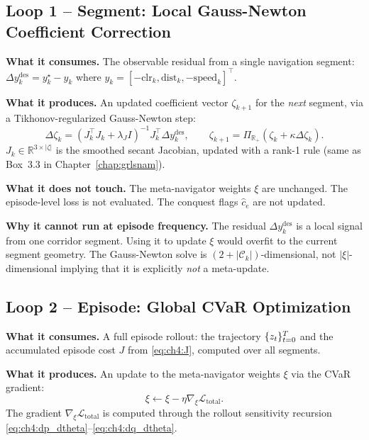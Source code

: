 \subsection{Loop 1 -- Segment: Local Gauss-Newton Coefficient Correction}
\label{subsec:ch4:seg_loop}

\textbf{What it consumes.}
The observable residual from a single navigation segment:
$\Delta y_k^{\mathrm{des}} = y_k^\star - y_k$ where
$y_k = [-\mathrm{clr}_k, \mathrm{dist}_k, -\mathrm{speed}_k]^\top$.

\textbf{What it produces.}
An updated coefficient vector $\zeta_{k+1}$ for the \emph{next}
segment, via a Tikhonov-regularized Gauss-Newton step:
\begin{equation}
  \Delta\zeta_k = (J_k^\top J_k + \lambda_J I)^{-1}J_k^\top\Delta y_k^{\mathrm{des}},
  \qquad
  \zeta_{k+1} = \Pi_{\mathbb{R}_+}(\zeta_k + \kappa\Delta\zeta_k).
  \label{eq:ch4:seg_update}
\end{equation}
$J_k \in \mathbb{R}^{3\times|\zeta|}$ is the smoothed secant Jacobian,
updated with a rank-1 rule (same as Box~3.3 in Chapter~\ref{chap:grlsnam}).

\textbf{What it does not touch.}
The meta-navigator weights $\xi$ are unchanged.
The episode-level loss is not evaluated.
The conquest flags $\hat{c}_e$ are not updated.

\textbf{Why it cannot run at episode frequency.}
The residual $\Delta y_k^{\mathrm{des}}$ is a local signal from one
corridor segment.
Using it to update $\xi$ would overfit to the current segment geometry.
The Gauss-Newton solve is $(2+|\mathcal{C}_k|)$-dimensional,
not $|\xi|$-dimensional implying that it is explicitly \emph{not} a meta-update.

\subsection{Loop 2 -- Episode: Global CVaR Optimization}
\label{subsec:ch4:ep_loop}

\textbf{What it consumes.}
A full episode rollout: the trajectory $\{z_t\}_{t=0}^T$
and the accumulated episode cost $J$ from \eqref{eq:ch4:J},
computed over all segments.

\textbf{What it produces.}
An update to the meta-navigator weights $\xi$ via the CVaR gradient:
\begin{equation}
  \xi \leftarrow \xi - \eta\nabla_\xi\mathcal{L}_{\mathrm{total}}.
  \label{eq:ch4:ep_update}
\end{equation}
The gradient $\nabla_\xi\mathcal{L}_{\mathrm{total}}$ is computed
through the rollout sensitivity recursion
\eqref{eq:ch4:dp_dtheta}--\eqref{eq:ch4:dq_dtheta}.

